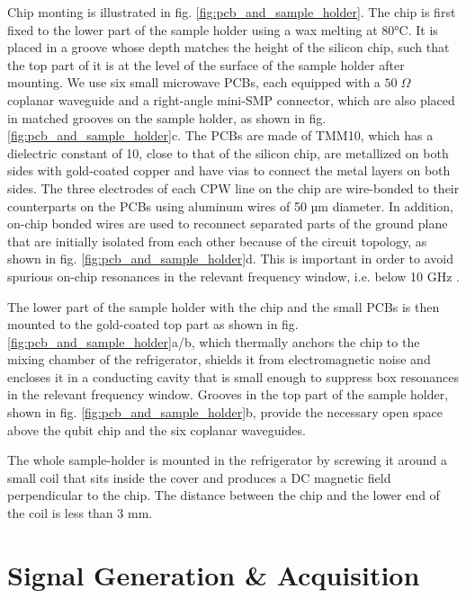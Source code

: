 Chip monting is illustrated in  fig. \ref{fig:pcb_and_sample_holder}. The chip is first fixed to the lower part of the sample holder using a wax melting at 80°C. It is placed in a groove whose depth matches the height of the silicon chip, such that the top part of it is at the level of the surface of the sample holder after mounting. We use six small microwave PCBs, each equipped with a $50\;\Omega$ coplanar waveguide and a right-angle mini-SMP connector, which are also placed in matched grooves on the sample holder, as shown in fig. \ref{fig:pcb_and_sample_holder}c. The PCBs are made of TMM10, which has a dielectric constant of 10, close to that of the silicon chip, are metallized on both sides with gold-coated copper and have vias to connect the metal layers on both sides. The three electrodes of each CPW line on the chip are wire-bonded to their counterparts on the PCBs using aluminum wires of 50 µm diameter. In addition, on-chip bonded wires are used to reconnect separated parts of the ground plane that are initially isolated from each other because of the circuit topology, as shown in fig. \ref{fig:pcb_and_sample_holder}d. This is important in order to avoid spurious on-chip resonances in the relevant frequency window, i.e. below 10 GHz \citep{schuster_circuit_2007}.

The lower part of the sample holder with the chip and the small PCBs is then mounted to the gold-coated top part as shown in fig. \ref{fig:pcb_and_sample_holder}a/b, which thermally anchors the chip to the mixing chamber of the refrigerator, shields it from electromagnetic noise and encloses it in a conducting cavity that is small enough to suppress box resonances in the relevant frequency window. Grooves in the top part of the sample holder, shown in fig. \ref{fig:pcb_and_sample_holder}b, provide the necessary open space above the qubit chip and the six coplanar waveguides.

The whole sample-holder is mounted in the refrigerator by screwing it around a small coil that sits inside the cover and produces a DC magnetic field perpendicular to the chip. The distance between the chip and the lower end of the coil is less than 3 mm.

\section{Signal Generation \& Acquisition}

